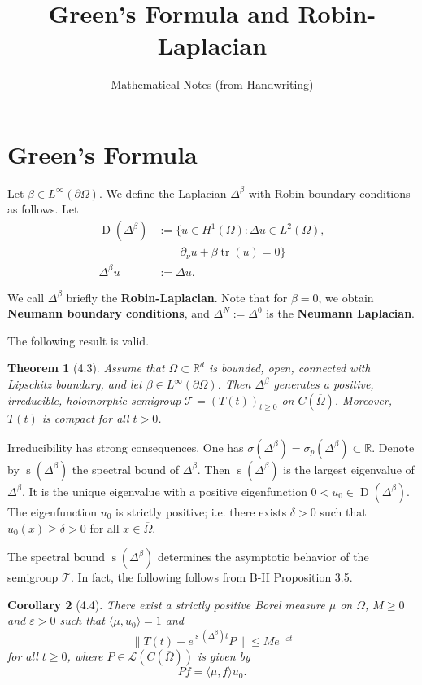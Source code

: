 \documentclass[11pt]{article}
\title{Green's Formula and Robin-Laplacian}
\author{Mathematical Notes (from Handwriting)}
\date{}
\newtheorem{theorem}{Theorem}[section]
\newtheorem{corollary}[theorem]{Corollary}
\DeclareMathOperator{\dom}{D}
\DeclareMathOperator{\spbound}{s}
\DeclareMathOperator{\tr}{tr}
\begin{document}
\maketitle

\section{Green's Formula}

Let $\beta \in L^\infty(\partial\Omega)$. We define the Laplacian $\Delta^\beta$ with Robin boundary conditions as follows. Let
\begin{align}
\dom(\Delta^\beta) &:= \{u \in H^1(\Omega) : \Delta u \in L^2(\Omega),\\
&\qquad \partial_\nu u + \beta \tr(u) = 0\}\\
\Delta^\beta u &:= \Delta u.
\end{align}

We call $\Delta^\beta$ briefly the \textbf{Robin-Laplacian}. Note that for $\beta = 0$, we obtain \textbf{Neumann boundary conditions}, and $\Delta^N := \Delta^0$ is the \textbf{Neumann Laplacian}.

The following result is valid.

\begin{theorem}[4.3]
Assume that $\Omega \subset \mathbb{R}^d$ is bounded, open, connected with Lipschitz boundary, and let $\beta \in L^\infty(\partial\Omega)$. Then $\Delta^\beta$ generates a positive, irreducible, holomorphic semigroup $\mathcal{T} = (T(t))_{t \geq 0}$ on $C(\overline{\Omega})$. Moreover, $T(t)$ is compact for all $t > 0$.
\end{theorem}

Irreducibility has strong consequences. One has $\sigma(\Delta^\beta) = \sigma_p(\Delta^\beta) \subset \mathbb{R}$. Denote by $\spbound(\Delta^\beta)$ the spectral bound of $\Delta^\beta$. Then $\spbound(\Delta^\beta)$ is the largest eigenvalue of $\Delta^\beta$. It is the unique eigenvalue with a positive eigenfunction $0 < u_0 \in \dom(\Delta^\beta)$. The eigenfunction $u_0$ is strictly positive; i.e. there exists $\delta > 0$ such that $u_0(x) \geq \delta > 0$ for all $x \in \overline{\Omega}$.

The spectral bound $\spbound(\Delta^\beta)$ determines the asymptotic behavior of the semigroup $\mathcal{T}$. In fact, the following follows from B-II Proposition 3.5.

\begin{corollary}[4.4]
There exist a strictly positive Borel measure $\mu$ on $\overline{\Omega}$, $M \geq 0$ and $\varepsilon > 0$ such that $\langle \mu, u_0 \rangle = 1$ and
\begin{equation}
\|T(t) - e^{\spbound(\Delta^\beta)t} P\| \leq M e^{-\varepsilon t}
\end{equation}
for all $t \geq 0$, where $P \in \mathcal{L}(C(\overline{\Omega}))$ is given by
\begin{equation}
Pf = \langle \mu, f \rangle u_0.
\end{equation}
\end{corollary}
\end{document}
